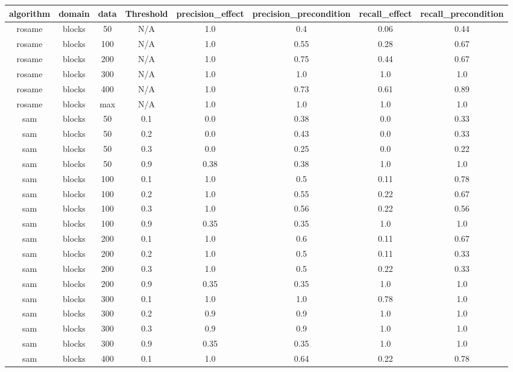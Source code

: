 \begin{table}[ht]
\centering
\begin{tabular}{c|c|c|c|c|c|c|c}
\hline
algorithm & domain & data & Threshold & precision_effect & precision_precondition & recall_effect & recall_precondition \\ \hline
rosame & blocks & 50 & N/A & 1.0 & 0.4 & 0.06 & 0.44 \\ \hline
rosame & blocks & 100 & N/A & 1.0 & 0.55 & 0.28 & 0.67 \\ \hline
rosame & blocks & 200 & N/A & 1.0 & 0.75 & 0.44 & 0.67 \\ \hline
rosame & blocks & 300 & N/A & 1.0 & 1.0 & 1.0 & 1.0 \\ \hline
rosame & blocks & 400 & N/A & 1.0 & 0.73 & 0.61 & 0.89 \\ \hline
rosame & blocks & max & N/A & 1.0 & 1.0 & 1.0 & 1.0 \\ \hline
sam & blocks & 50 & 0.1 & 0.0 & 0.38 & 0.0 & 0.33 \\ \hline
sam & blocks & 50 & 0.2 & 0.0 & 0.43 & 0.0 & 0.33 \\ \hline
sam & blocks & 50 & 0.3 & 0.0 & 0.25 & 0.0 & 0.22 \\ \hline
sam & blocks & 50 & 0.9 & 0.38 & 0.38 & 1.0 & 1.0 \\ \hline
sam & blocks & 100 & 0.1 & 1.0 & 0.5 & 0.11 & 0.78 \\ \hline
sam & blocks & 100 & 0.2 & 1.0 & 0.55 & 0.22 & 0.67 \\ \hline
sam & blocks & 100 & 0.3 & 1.0 & 0.56 & 0.22 & 0.56 \\ \hline
sam & blocks & 100 & 0.9 & 0.35 & 0.35 & 1.0 & 1.0 \\ \hline
sam & blocks & 200 & 0.1 & 1.0 & 0.6 & 0.11 & 0.67 \\ \hline
sam & blocks & 200 & 0.2 & 1.0 & 0.5 & 0.11 & 0.33 \\ \hline
sam & blocks & 200 & 0.3 & 1.0 & 0.5 & 0.22 & 0.33 \\ \hline
sam & blocks & 200 & 0.9 & 0.35 & 0.35 & 1.0 & 1.0 \\ \hline
sam & blocks & 300 & 0.1 & 1.0 & 1.0 & 0.78 & 1.0 \\ \hline
sam & blocks & 300 & 0.2 & 0.9 & 0.9 & 1.0 & 1.0 \\ \hline
sam & blocks & 300 & 0.3 & 0.9 & 0.9 & 1.0 & 1.0 \\ \hline
sam & blocks & 300 & 0.9 & 0.35 & 0.35 & 1.0 & 1.0 \\ \hline
sam & blocks & 400 & 0.1 & 1.0 & 0.64 & 0.22 & 0.78 \\ \hline

\end{tabular}
\end{table}
